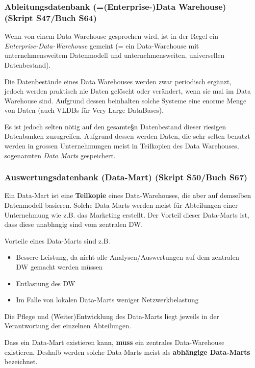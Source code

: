 \documentclass[a4paper, 11pt, nofootinbib]{article}
\begin{document}
\subsubsection{Ableitungsdatenbank (=(Enterprise-)Data Warehouse) (Skript S47/Buch S64)}
Wenn von einem Data Warehouse gesprochen wird, ist in der Regel ein \textit{Enterprise-Data-Warehouse} gemeint (= ein Data-Warehouse mit unternehmensweitem Datenmodell und unternehmensweiten, universellen Datenbestand). 

\vspace{10px}

\noindent Die Datenbestände eines Data Warehouses werden zwar periodisch ergänzt, jedoch werden praktisch nie Daten gelöscht oder verändert, wenn sie mal im Data Warehouse sind. Aufgrund dessen beinhalten solche Systeme eine enorme Menge von Daten (auch VLDBs für Very Large DataBases).

Es ist jedoch selten nötig auf den gesamte§n Datenbestand dieser riesigen Datenbanken zuzugreifen. Aufgrund dessen werden Daten, die sehr selten benutzt werden in grossen Unternehmungen meist in Teilkopien des Data Warehouses, sogenannten \textit{Data Marts} gespeichert.

\subsubsection{Auswertungsdatenbank (Data-Mart) (Skript S50/Buch S67)}
Ein Data-Mart ist eine \textbf{Teilkopie} eines Data-Warehouses, die aber auf demselben Datenmodell basieren. Solche Data-Marts werden meist für Abteilungen einer Unternehmung wie z.B. das Marketing erstellt. Der Vorteil dieser Data-Marts ist, dass diese unabhngig sind vom zentralen DW.

Vorteile eines Data-Marts sind z.B. 

\begin{itemize}
	\item Bessere Leistung, da nicht alle Analysen/Auswertungen auf dem zentralen DW gemacht werden müssen
	\item Entlastung des DW
	\item Im Falle von lokalen Data-Marts weniger Netzwerkbelastung
\end{itemize}

Die Pflege und (Weiter)Entwicklung des Data-Marts liegt jeweils in der Verantwortung der einzelnen Abteilungen.

\vspace{10px}

\noindent Dass ein Data-Mart existieren kann, \textbf{muss} ein zentrales Data-Warehouse existieren. Deshalb werden solche Data-Marts meist als \textbf{abhängige Data-Marts} bezeichnet.
\end{document}
